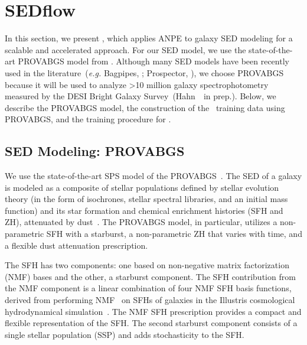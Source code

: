 \section{SEDflow} \label{sec:sedflow}
In this section, we present \sedflow, which applies ANPE to galaxy SED modeling
for a scalable and accelerated approach.
For our SED model, we use the state-of-the-art PROVABGS model from
\cite{hahn2022}. 
Although many SED models have been recently used in the
literature~(\emph{e.g.} {\sc Bagpipes}, \citealt{carnall2018}; 
{\sc Prospector}, \citealt{leja2017, johnson2021}), we choose PROVABGS because
it will be used to analyze >10 million galaxy spectrophotometry measured by the
DESI Bright Galaxy Survey~(Hahn~\etal~in prep.).
Below, we describe the PROVABGS model, the construction of the
\sedflow~training data using PROVABGS, and the training procedure for \sedflow.

\subsection{SED Modeling: PROVABGS} \label{sec:provabgs}
We use the state-of-the-art SPS model of the
PROVABGS~\citep{hahn2022}. 
The SED of a galaxy is modeled as a composite of stellar populations defined by
stellar evolution theory (in the form of isochrones, stellar spectral
libraries, and an initial mass function) and its star
formation and chemical enrichment histories (SFH and ZH), attenuated by
dust~\citep[see][for a review]{walcher2011, conroy2013}. 
The PROVABGS model, in particular, utilizes a non-parametric SFH with a
starburst, a non-parametric ZH that varies with time, and a flexible dust
attenuation prescription.

The SFH has two components: one based on non-negative matrix factorization
(NMF) bases and the other, a starburst component.
The SFH contribution from the NMF component is a linear combination of four NMF
SFH basis functions, derived from performing NMF~\citep{lee1999, cichocki2009,
fevotte2011} on SFHs of galaxies in the Illustris cosmological hydrodynamical
simulation~\citep{vogelsberger2014, genel2014, nelson2015}.
The NMF SFH prescription provides a compact and flexible representation of the
SFH.
The second starburst component consists of a single stellar population (SSP)
and adds stochasticity to the SFH. 

